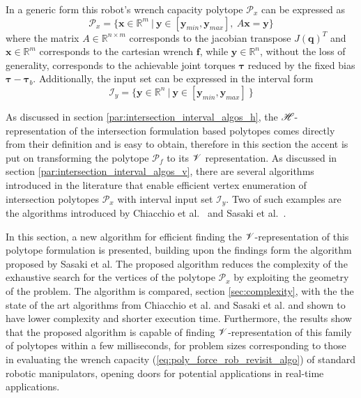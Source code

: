 In a generic form this robot's wrench capacity polytope $\mathcal{P}_x$ can be expressed as
\begin{equation}
    \mathcal{P}_x=\{\bm{x}\in\mathbb{R}^m~ |~\bm{y}\in[\bm{y}_{min}, \bm{y}_{max}], ~ A\bm{x} = \bm{y}\}
    \label{eq:inter_hyp_revisit_algo}
\end{equation}
where the matrix $A\in\mathbb{R}^{n\times m}$ corresponds to the jacobian transpose $J(\bm{q})^T$ and $\bm{x}\in\mathbb{R}^m$ corresponds to the cartesian wrench $\bm{f}$, while $\bm{y}\in\mathbb{R}^n$, without the loss of generality, corresponds to the achievable joint torques $\bm{\tau}$ reduced by the fixed bias $\bm{\tau} - \bm{\tau}_b$.  Additionally, the input set can be expressed in the interval form
\begin{equation}
    \mathcal{I}_y=\{\bm{y}\in\mathbb{R}^n~ |~\bm{y}\in[\bm{y}_{min}, \bm{y}_{max}]~\}
    \label{eq:interval_revisit_algo}
\end{equation}

As discussed in section \ref{par:intersection_interval_algos_h}, the $\mathscr{H}$-representation of the intersection formulation based polytopes comes directly from their definition and is easy to obtain, therefore in this section the accent is put on transforming the polytope $\mathcal{P}_f$ to its $\mathscr{V}$ representation. As discussed in section \ref{par:intersection_interval_algos_v}, there are several algorithms introduced in the literature that enable efficient vertex enumeration of intersection polytopes $\mathcal{P}_x$  with interval input set $\mathcal{I}_y$. Two of such examples are the algorithms introduced by Chiacchio et al.~\cite{chiacchio_evaluation_1996} and Sasaki et al.~\cite{sasaki2011vertex}.

In this section, a new algorithm for efficient finding the $\mathscr{V}$-representation of this polytope formulation is presented, building upon the findings form the algorithm proposed by Sasaki et al. The proposed algorithm reduces the complexity of the exhaustive search for the vertices of the polytope $\mathcal{P}_x$ by exploiting the geometry of the problem. The algorithm is compared, section \ref{sec:complexity}, with the the state of the art algorithms from Chiacchio et al. and Sasaki et al. and shown to have lower complexity and shorter execution time. Furthermore, the results show that the proposed algorithm is capable of finding $\mathscr{V}$-representation of this family of polytopes within a few milliseconds, for problem sizes corresponding to those in evaluating the wrench capacity (\ref{eq:poly_force_rob_revisit_algo}) of standard robotic manipulators, opening doors for potential applications in real-time applications.


